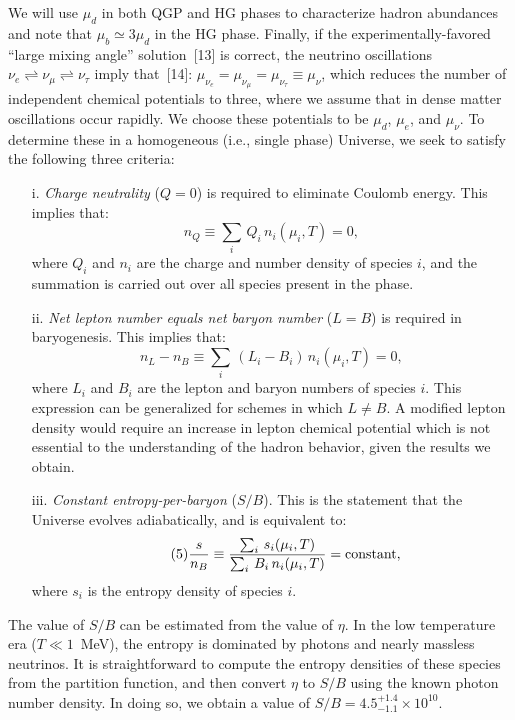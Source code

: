 \begin{mdframed}[linecolor=gray,roundcorner=12pt,backgroundcolor=Dandelion!15,linewidth=1pt,leftmargin=0cm,rightmargin=0cm,topline=true,bottomline=true,skipabove=12pt]
We will use $\mu_d$ in both QGP and HG phases to characterize hadron abundances and note that $\mu_b\simeq 3\mu_d$ in the HG phase. Finally, if the experimentally-favored ``large mixing angle'' solution~[13] is correct, the neutrino oscillations $\nu_e \rightleftharpoons \nu_\mu \rightleftharpoons \nu_\tau$ imply that~[14]: $\mu_{\nu_e} = \mu_{\nu_{\mu}} =\mu_{\nu_{\tau}} \equiv \mu_\nu$, which reduces the number of independent chemical potentials to three, where we assume that in dense matter oscillations occur rapidly. We choose these potentials  to be $\mu_d$, $\mu_e$, and $\mu_\nu$. To determine these in a homogeneous (i.e., single phase) Universe, we seek to satisfy the following three criteria:
\begin{itemize}
\item[i.] {\it Charge neutrality} ($Q = 0$) is required to eliminate  Coulomb energy.  This implies that:
\begin{equation}\tag{3}\label{Q0}
n_Q\equiv \sum_i\, Q_i\, n_i (\mu_i, T)=0, 
\end{equation}
where $Q_i$ and $n_i$ are the charge and number density of species $i$, and the summation is carried out over all species present in the phase. \item[ii.] {\it Net lepton number equals net baryon number} ($L = B$) is required in baryogenesis.  This implies that:
\begin{equation}\tag{4}\label{LB0}
n_L - n_B\equiv \sum_i\, (L_i - B_i)\, n_i (\mu_i, T)=0 ,
\end{equation}
where $L_i$ and $B_i$ are the lepton and baryon numbers of species $i$. This expression can be generalized  for schemes in which $L\ne B$. A modified lepton density would require an increase in lepton chemical potential which is not essential to the understanding of the hadron behavior, given the results we obtain.  \item[iii.] {\it Constant entropy-per-baryon} ($S/B$).  This is the statement that the Universe evolves adiabatically, and is equivalent to:
\begin{equation}\tag{5}\label{SperB}
\frac{s}{n_B}\equiv\frac{\sum_i\, s_i(\mu_i, T)}{\sum_i\, B_i\, n_i(\mu_i, T)}
  ={\rm constant,}
\end{equation}
where $s_i$ is the entropy density of species $i$.
\end{itemize}

The value of $S/B$ can be estimated from the value of $\eta$. In the low temperature era ($T \ll 1$~MeV), the entropy is dominated by photons and nearly massless neutrinos. It is straightforward to compute the entropy densities of these species from the partition function, and then convert $\eta$ to $S/B$ using the known photon number density. In doing so, we obtain a value of $S/B = 4.5^{+1.4}_{-1.1} \times 10^{10}$.


\end{mdframed}
